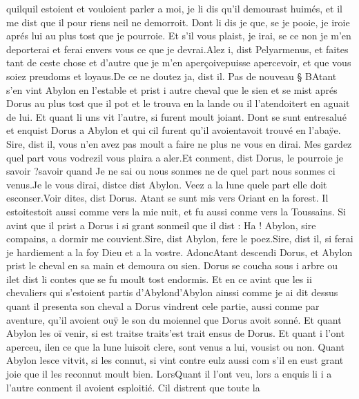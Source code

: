 \documentclass{article}
\begin{document}
\begin{pages}
         quilquil estoient et vouloient parler a moi, je li dis 
      qu’il demourast huimés, et il me dist que 
      il pour riens neil ne demorroit. Dont li dis je que, 
   se je pooie, je iroie aprés lui au plus tost que je pourroie. Et s’il vous plaist, je irai, 
   se ce non je m’en deporterai et ferai envers vous ce que je devrai.Alez i, dist Pelyarmenus, et faites tant de ceste chose 
      et d’autre que je m’en aperçoivepuisse apercevoir, et que vous soiez 
      preudoms et loyaus.De ce ne doutez ja, dist il. \pend
\pstart Pas de nouveau § BAtant s’en vint 
   Abylon 
   en l’estable et prist i autre cheval 
   que le sien et se mist aprés Dorus au plus tost que il pot et le trouva en la lande ou il 
   l’atendoitert en aguait de lui. Et quant li uns vit l’autre, si furent 
   moult joiant. Dont se sunt entresalué et enquist 
   Dorus a Abylon et qui cil furent 
   qu’il avoientavoit trouvé en 
      l’abaÿe.
   Sire, dist il, vous n’en avez pas moult a faire ne plus ne vous en dirai. 
      Mes gardez quel part vous vodrezil vous plaira a aler.Et conment, dist Dorus, le 
      pourroie je 
      savoir ?savoir quand
   Je ne sai ou nous sonmes ne de quel part nous sonmes ci venus.Je le vous dirai, distce dist 
      Abylon. Veez a la lune quele part elle doit esconser.Voir dites, dist Dorus. 
   Atant se sunt mis vers Oriant en la forest. Il estoitestoit aussi comme vers la 
   mie nuit, et fu aussi conme vers la Toussains. 
   Si avint que il prist a Dorus i si grant sonmeil que il dist :
   Ha ! Abylon, 
      sire compains, a dormir me couvient.Sire, dist Abylon, fere le poez.Sire, dist il, si ferai je hardiement 
      a la foy Dieu et a la vostre. \pend
\pstart AdoncAtant descendi 
   Dorus, et Abylon 
   prist le cheval en sa main et demoura ou sien. Dorus se coucha sous i arbre 
   ou ilet dist li contes que se fu moult tost endormis. Et en ce avint que 
   les ii chevaliers qui s’estoient partis 
   d’Abylond'Abylon ainssi comme je ai dit dessus quant il presenta son cheval a 
   Dorus vindrent cele partie, 
   aussi conme par aventure, qu’il avoient ouÿ le son du moiennel que Dorus avoit sonné. 
   Et quant Abylon les oï venir, si 
   est traitse traits'est trait 
   ensus de Dorus. Et quant i 
   l’ont aperceu, 
   ilen ce que la lune luisoit clere, sont venus a lui, vousist ou non. 
   Quant Abylon lesce 
   vitvit, si les connut, si vint contre eulz aussi com s’il 
   en eust grant joie 
   que il les reconnut moult bien. 
   LorsQuant il l'ont veu, lors a enquis li i a l’autre 
   conment il avoient esploitié. Cil distrent que toute la 

\end{pages}
\end{document}
